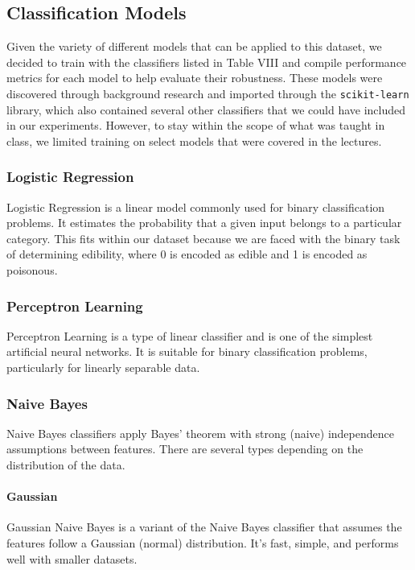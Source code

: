 \documentclass[11pt, conference]{IEEEtran}
\begin{document}
    \subsection{Classification Models}
    Given the variety of different models that can be applied to this dataset, we decided to train with the classifiers listed in Table VIII and compile performance metrics for each model to help evaluate their robustness. These models were discovered through background research and imported through the \texttt{scikit-learn} library, which also contained several other classifiers that we could have included in our experiments. However, to stay within the scope of what was taught in class, we limited training on select models that were covered in the lectures. 
    
        \subsubsection{Logistic Regression}
        Logistic Regression is a linear model commonly used for binary classification problems. It estimates the probability that a given input belongs to a particular category. This fits within our dataset because we are faced with the binary task of determining edibility, where 0 is encoded as edible and 1 is encoded as poisonous.

        \subsubsection{Perceptron Learning}
        Perceptron Learning is a type of linear classifier and is one of the simplest artificial neural networks. It is suitable for binary classification problems, particularly for linearly separable data.

        \subsubsection{Naive Bayes}
        Naive Bayes classifiers apply Bayes' theorem with strong (naive) independence assumptions between features. There are several types depending on the distribution of the data.
            \paragraph{Gaussian}
            Gaussian Naive Bayes is a variant of the Naive Bayes classifier that assumes the features follow a Gaussian (normal) distribution. It's fast, simple, and performs well with smaller datasets.
\end{document}
